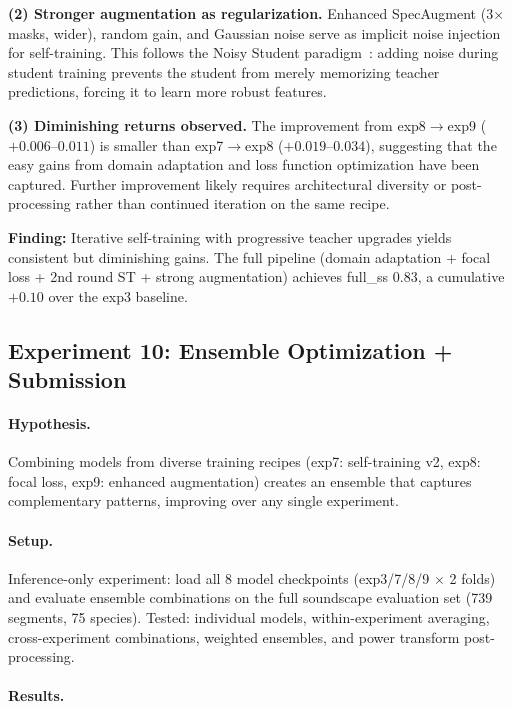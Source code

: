 \textbf{(2) Stronger augmentation as regularization.}
Enhanced SpecAugment (3$\times$ masks, wider), random gain, and Gaussian noise
serve as implicit noise injection for self-training. This follows the
Noisy Student paradigm~\cite{xie2020self}: adding noise during student
training prevents the student from merely memorizing teacher predictions,
forcing it to learn more robust features.

\textbf{(3) Diminishing returns observed.}
The improvement from exp8$\to$exp9 ($+0.006$--$0.011$) is smaller than
exp7$\to$exp8 ($+0.019$--$0.034$), suggesting that the easy gains from
domain adaptation and loss function optimization have been captured.
Further improvement likely requires architectural diversity or
post-processing rather than continued iteration on the same recipe.

\textbf{Finding:} Iterative self-training with progressive teacher upgrades
yields consistent but diminishing gains. The full pipeline (domain adaptation +
focal loss + 2nd round ST + strong augmentation) achieves full\_ss
0.83, a cumulative $+0.10$ over the exp3 baseline.

\subsection{Experiment 10: Ensemble Optimization + Submission}
\label{sec:exp10}

\paragraph{Hypothesis.}
Combining models from diverse training recipes (exp7: self-training v2,
exp8: focal loss, exp9: enhanced augmentation) creates an ensemble that
captures complementary patterns, improving over any single experiment.

\paragraph{Setup.}
Inference-only experiment: load all 8 model checkpoints (exp3/7/8/9 $\times$ 2
folds) and evaluate ensemble combinations on the full soundscape evaluation set
(739 segments, 75 species). Tested: individual models, within-experiment
averaging, cross-experiment combinations, weighted ensembles, and power transform
post-processing.

\paragraph{Results.}

